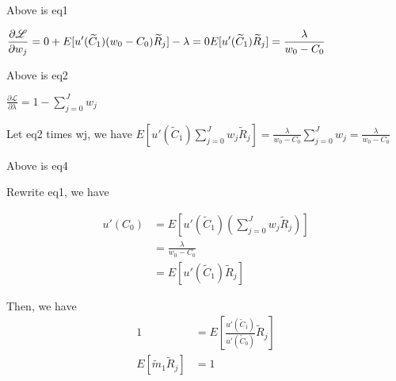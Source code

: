 \documentclass[uplatex,a4paper]{jsarticle}
\begin{document}
Above is eq1

$
\displaystyle
\frac{\partial \mathscr{L} }{\partial w_j}  =
0 + E[u'(\widetilde C_1)(w_0 - C_0)\widetilde R_j] - \lambda
= 0 \\
E[u'(\widetilde C_1)\widetilde R_j] = \frac{\lambda}{w_0 - C_0}
$

Above is eq2

$
\displaystyle
\frac{\partial \mathscr{L} }{\partial \lambda}  =
1 - \sum_{j=0}^{J} w_j
$

Let eq2 times wj, we have
$
\displaystyle
E[u'(\widetilde C_1) \sum_{j=0}^{J} w_j \widetilde R_j] = \frac{\lambda}{w_0 - C_0} \sum_{j=0}^{J}  w_j= \frac{\lambda}{w_0 - C_0}
$

Above is eq4


Rewrite eq1, we have

\begin{align*}
    u'(C_0)
            &= E[u'(\widetilde C_1)(\sum_{j=0}^{J} w_j \widetilde R_j)] \\
            &= \frac{\lambda}{w_0 - C_0} \\
            &= E[u'(\widetilde C_1)\widetilde R_j]
\end{align*}

Then, we have
\begin{align*}
    1 &= E[ \frac{u'(\widetilde C_1)}{u'(\widetilde C_0)}\widetilde R_j] \\
    E[\widetilde m_1 \widetilde R_j] &=1
\end{align*}
\end{document}

